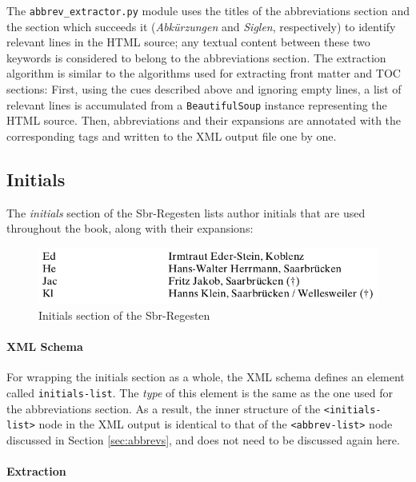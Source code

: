 The \texttt{abbrev\_extractor.py} module uses the titles of the
abbreviations section and the section which succeeds it
(\emph{Abkürzungen} and \emph{Siglen}, respectively) to identify
relevant lines in the HTML source; any textual content between these
two keywords is considered to belong to the abbreviations section. The
extraction algorithm is similar to the algorithms used for extracting
front matter and TOC sections: First, using the cues described above
and ignoring empty lines, a list of relevant lines is accumulated from
a \texttt{BeautifulSoup} instance representing the HTML source. Then,
abbreviations and their expansions are annotated with the
corresponding tags and written to the XML output file one by one.

\subsection{Initials}
\label{sec:initials}

The \emph{initials} section of the Sbr-Regesten lists author initials
that are used throughout the book, along with their expansions:

\begin{figure}[h]
  \centering
  \includegraphics[scale=0.4]{img/initials}
  \caption{Initials section of the Sbr-Regesten}
  \label{fig:initials}
\end{figure}

\paragraph{XML Schema}

For wrapping the initials section as a whole, the XML schema defines
an element called \texttt{initials-list}. The \emph{type} of this
element is the same as the one used for the abbreviations section. As
a result, the inner structure of the \texttt{<initials-list>} node in
the XML output is identical to that of the \texttt{<abbrev-list>} node
discussed in Section \ref{sec:abbrevs}, and does not need to be
discussed again here.

\paragraph{Extraction}

